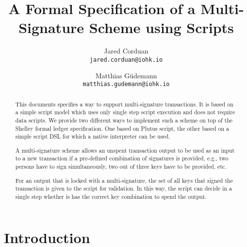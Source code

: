 \documentclass[11pt,a4paper,dvipsnames]{article}
\theoremstyle{definition}
\begin{document}

\title{A Formal Specification of a Multi-Signature Scheme using Scripts}

\author{Jared Corduan  \\ {\small \texttt{jared.corduan@iohk.io}} \\
   \and Matthias G\"udemann  \\ {\small \texttt{matthias.gudemann@iohk.io}}}


\maketitle

\begin{abstract}
  This documents specifies a way to support multi-signature transactions. It is
  based on a simple script model which uses only single step script execution
  and does not require data scripts. We provide two different ways to implement
  such a scheme on top of the Shelley formal ledger specification. One based on
  Plutus script, the other based on a simple script DSL for which a native
  interpreter can be used.

  A multi-signature scheme allows an unspent transaction output to be used as an
  input to a new transaction if a pre-defined combination of signatures is
  provided, e.g., two persons have to sign simultaneously, two out of three
  keys have to be provided, etc.

  For an output that is locked with a multi-signature, the set of all keys that
  signed the transaction is given to the script for validation. In this way, the
  script can decide in a single step whether is has the correct key combination
  to spend the output.
\end{abstract}



\section{Introduction}
\label{sec:introduction}
\end{document}
